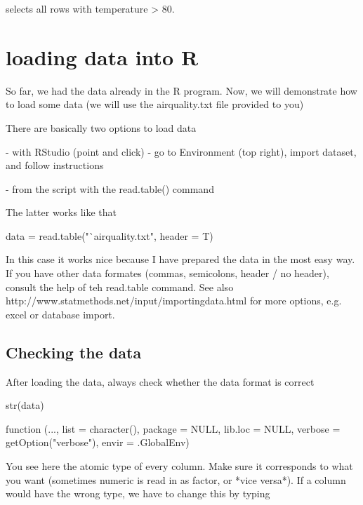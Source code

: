 \documentclass[a4paper,twoside]{tufte-book}\usepackage[]{graphicx}\usepackage[]{color}
\begin{document}
\begin{appendices}
selects all rows with temperature > 80.


\section{loading data into R}

So far, we had the data already in the R program. Now, we will demonstrate how to load some data (we will use the airquality.txt file provided to you)

There are basically two options to load data

- with RStudio (point and click) - go to Environment (top right), import dataset, and follow instructions

- from the script with the read.table() command

The latter works like that


\begin{Schunk}
\begin{Sinput}
data = read.table("`airquality.txt", header = T)
\end{Sinput}
\end{Schunk}

In this case it works nice because I have prepared the data in the most easy way. If you have other data formates (commas, semicolons, header / no header), consult the help of teh read.table command. See also http://www.statmethods.net/input/importingdata.html for more options, e.g. excel or database import. 

\subsection{Checking the data}

After loading the data, always check whether the data format is correct 

\begin{Schunk}
\begin{Sinput}
str(data)
\end{Sinput}
\begin{Soutput}
function (..., list = character(), package = NULL, lib.loc = NULL, 
    verbose = getOption("verbose"), envir = .GlobalEnv)  
\end{Soutput}
\end{Schunk}

You see here the atomic type of every column. Make sure it corresponds to what you want (sometimes numeric is read in as factor, or *vice versa*). If a column would have the wrong type, we have to change this by typing


\end{appendices}
\end{document}
